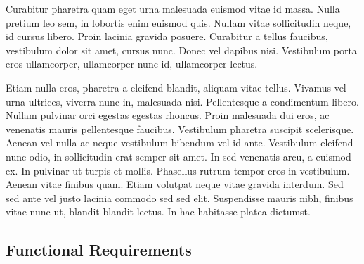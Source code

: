 \documentclass[12pt,letterpaper]{article}
\begin{document}
Curabitur pharetra quam eget urna malesuada euismod vitae
id massa. Nulla pretium leo sem, in lobortis enim euismod quis. Nullam
vitae sollicitudin neque, id cursus libero. Proin lacinia gravida
posuere. Curabitur a tellus faucibus, vestibulum dolor sit amet, cursus
nunc. Donec vel dapibus nisi. Vestibulum porta eros ullamcorper,
ullamcorper nunc id, ullamcorper lectus.

Etiam nulla eros, pharetra a eleifend blandit, aliquam vitae
tellus. Vivamus vel urna ultrices, viverra nunc in, malesuada nisi.
Pellentesque a condimentum libero. Nullam pulvinar orci egestas egestas
rhoncus. Proin malesuada dui eros, ac venenatis mauris pellentesque
faucibus. Vestibulum pharetra suscipit scelerisque. Aenean vel nulla
ac neque vestibulum bibendum vel id ante. Vestibulum eleifend nunc
odio, in sollicitudin erat semper sit amet. In sed venenatis arcu,
a euismod ex. In pulvinar ut turpis et mollis. Phasellus rutrum tempor
eros in vestibulum. Aenean vitae finibus quam. Etiam volutpat neque
vitae gravida interdum. Sed sed ante vel justo lacinia commodo sed
sed elit. Suspendisse mauris nibh, finibus vitae nunc ut, blandit
blandit lectus. In hac habitasse platea dictumst.

\subsection{Functional Requirements}
\end{document}
